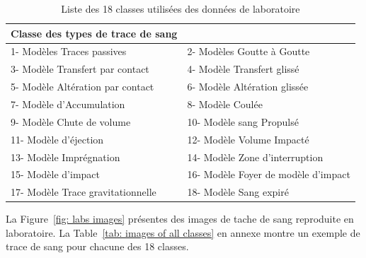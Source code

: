 \documentclass[a4paper]{article}
\begin{document}
\begin{table}[H]
    \centering
    \begin{tabular}{|ll|}
        \hline
        \textbf{Classe des types de trace de sang} &  \\
        \hline
        1- Modèles Traces passives & 2- Modèles Goutte à Goutte \\
        3- Modèle Transfert par contact & 4- Modèle Transfert glissé \\
        5- Modèle Altération par contact & 6- Modèle Altération glissée \\
        7- Modèle d'Accumulation & 8- Modèle Coulée \\
        9- Modèle Chute de volume & 10- Modèle sang Propulsé \\
        11- Modèle d'éjection & 12- Modèle Volume Impacté \\
        13- Modèle Imprégnation & 14- Modèle Zone d'interruption \\
        15- Modèle d'impact & 16- Modèle Foyer de modèle d'impact \\
        17- Modèle Trace gravitationnelle & 18- Modèle Sang expiré \\
        \hline
    \end{tabular}
    \caption{Liste des 18 classes utilisées des données de laboratoire}
    \label{tab:classes}
\end{table}

La Figure~\ref{fig: labs images} présentes des images de tache de sang reproduite en laboratoire. La Table~\ref{tab: images of all classes} en annexe montre un exemple de trace de sang pour chacune des 18 classes.
\end{document}
